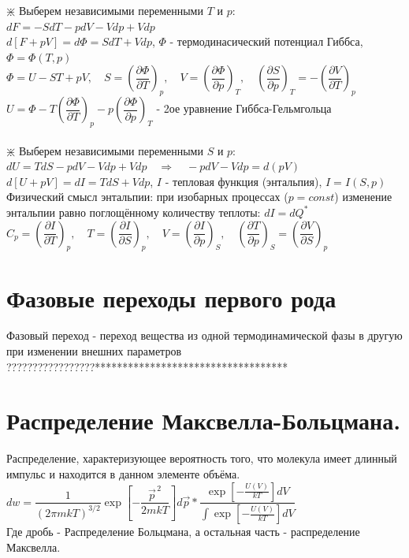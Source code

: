 \begin{multicols*}{2}
		$\divideontimes$ Выберем независимыми переменными $T$ и $p$:\\
		$dF = -SdT - pdV - Vdp + Vdp$\\
		$d\left[F + pV\right] = d\Phi = S dT + V dp$, \quad $\Phi$ - термодинасический потенциал Гиббса, \quad $\Phi = \Phi(T, p)$\\
		$\Phi = U-ST+pV, \quad S = \left(\dfrac{\partial \Phi}{\partial T}\right)_p, \quad V = \left(\dfrac{\partial \Phi}{\partial p}\right)_T, \quad \left(\dfrac{\partial S}{\partial p}\right)_T = - \left(\dfrac{\partial V}{\partial T}\right)_p$\\
		$U = \Phi - T \left(\dfrac{\partial \Phi}{\partial T}\right)_p - p \left(\dfrac{\partial \Phi}{\partial p}\right)_T$ - 2ое уравнение Гиббса-Гельмгольца\\\\

		$\divideontimes$ Выберем независимыми переменными $S$ и $p$:\\
		$dU = TdS - pdV - Vdp + Vdp \quad \Rightarrow \quad - pdV - Vdp = d(pV)$\\
		$d\left[U + pV\right] = dI = T dS + V dp$, \quad $I$ - тепловая функция (энтальпия), \quad $I = I(S, p)$\\
		Физический смысл энтальпии: при изобарных процессах ($p = const$) изменение энтальпии равно поглощённому количеству теплоты: $dI = dQ^*$\\
		$C_p = \left(\dfrac{\partial I}{\partial T}\right)_p, \quad T = \left(\dfrac{\partial I}{\partial S}\right)_p, \quad V = \left(\dfrac{\partial I}{\partial p}\right)_S, \quad \left(\dfrac{\partial T}{\partial p}\right)_S = \left(\dfrac{\partial V}{\partial S}\right)_p$\\
 
		\section{Фазовые переходы первого рода}
		Фазовый переход - переход вещества из одной термодинамической фазы в другую при изменении внешних параметров\\
		?????????????????***********************************\\

		\section{Распределение Максвелла-Больцмана.}
		Распределение, характеризующее вероятность того, что молекула имеет длинный импульс и находится в данном элементе объёма.\\
		$dw=\dfrac 1 {(2\pi mkT)^{3/2}}\exp\left[-\dfrac{\vec {p}^{\,2}}{2mkT}\right]d\vec p * \dfrac{\exp\left[-\frac{U(V)}{kT}\right]dV}{\int\exp\left[-\frac{U(V)}{kT}\right]dV}$ \\
		Где дробь - Распределение Больцмана, а остальная часть - распределение Максвелла.\\


\end{multicols*}
